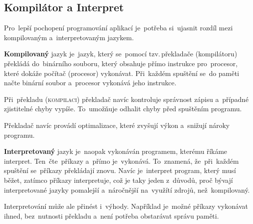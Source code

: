 \documentclass[14pt,a4paper]{article}
\begin{document}
        \subsection{Kompilátor a Interpret}
        Pro~lepší pochopení programování aplikací je~potřeba si~ujasnit rozdíl mezi kompilovaným a~interpretovaným jazykem.

        \textbf{Kompilovaný} jazyk je~jazyk, který se~pomocí tzv.\,překladače (kompilátoru) překládá do~binárního souboru, který obsahuje přímo instrukce pro~procesor, které dokáže počítač (procesor) vykonávat. Při~každém spuštění se~do paměti načte binární soubor a~procesor vykonává jeho instrukce.
        
        Při~překladu (\textsc{kompilaci}) překladač navíc kontroluje správnost zápisu a~případné zjistitelné chyby vypíše. To~umožňuje odhalit chyby před spuštěním programu.

        Překladač navíc provádí optimalizace, které zvyšují výkon a~snižují nároky programu.

        \textbf{Interpretovaný} jazyk je~naopak vykonáván programem, kterému říkáme interpret. Ten~čte~příkazy a~přímo je~vykonává. To~znamená, že~při~každém spuštění se~příkazy překládají znovu. Navíc je~interpret program, který musí běžet, zatímco příkazy interpretuje, což je taky jeden z~důvodů, proč bývají interpretované jazyky pomalejší a~náročnější na~využítí zdrojů, než~kompilovaný.
        
        Interpretování může ale přinést i~výhody. Například je~možné příkazy vykonávat ihned, bez~nutnosti překladu a~není potřeba obstarávat správu paměti. \parencite{ueda:compiled}
        
\end{document}
